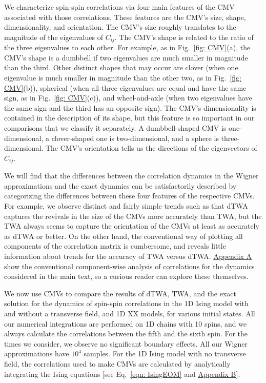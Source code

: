 \documentclass[pra,reprint,superscriptaddress]{revtex4-1}
\begin{document}
We characterize spin-spin correlations via four main features of the CMV associated with those correlations. These features are the CMV's size, shape, dimensionality, and orientation. The CMV's size roughly translates to the magnitude of the eigenvalues of $C_{ij}$. The CMV's shape is related to the ratio of the three eigenvalues to each other. For example, as in Fig.~\ref{fig: CMV}(a), the CMV's shape is a dumbbell if two eigenvalues are much smaller in magnitude than the third. Other distinct shapes that may occur are clover (when one eigenvalue is much smaller in magnitude than the other two, as in Fig.~\ref{fig: CMV}(b)), spherical (when all three eigenvalues are equal and have the same sign, as in Fig.~\ref{fig: CMV}(c)), and wheel-and-axle (when two eigenvalues have the same sign and the third has an opposite sign). The CMV's dimensionality is contained in the description of its shape, but this feature is so important in our comparisons that we classify it separately. A dumbbell-shaped CMV is one-dimensional, a clover-shaped one is two-dimensional, and a sphere is three-dimensional. The CMV's orientation tells us the directions of the eigenvectors of $C_{ij}$.

We will find that the differences between the correlation dynamics in the Wigner approximations and the exact dynamics can be satisfactorily described by categorizing the differences between these four features of the respective CMVs. For example, we observe distinct and fairly simple trends such as that dTWA captures the revivals in the size of the CMVs more accurately than TWA, but the TWA always seems to capture the orientation of the CMVs at least as accurately as dTWA or better. On the other hand, the conventional way of plotting all components of the correlation matrix is cumbersome, and reveals little information about trends for the accuracy of TWA versus dTWA. \hyperref[sec: component plots]{Appendix A} show the conventional component-wise analysis of correlations for the dynamics considered in the main text, so a curious reader can explore these themselves.

We now use CMVs to compare the results of dTWA, TWA, and the exact solution for the dynamics of spin-spin correlations in the 1D Ising model with and without a transverse field, and 1D XX models, for various initial states. All our numerical integrations are performed on 1D chains with 10 spins, and we always calculate the correlations between the fifth and the sixth spin. For the times we consider, we observe no significant boundary effects. All our Wigner approximations have $10^4$ samples. For the 1D Ising model with no transverse field, the correlations used to make CMVs are calculated by analytically integrating the Ising equations [see Eq.~\eqref{eqn: IsingEOM} and \hyperref[sec: analytical_expns]{Appendix B}].
\end{document}
